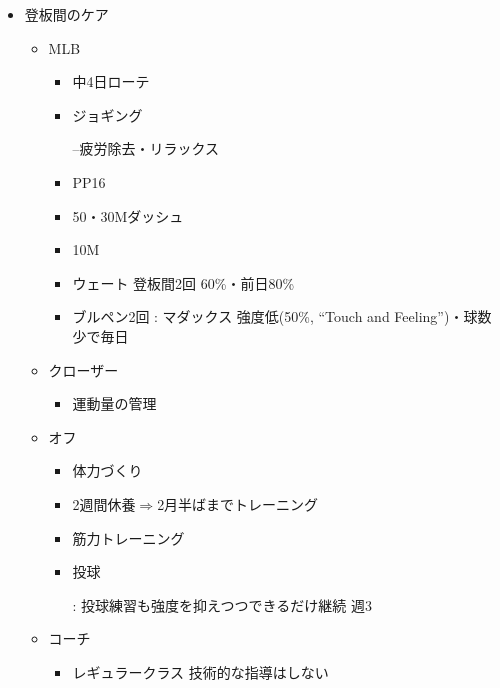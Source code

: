 \documentclass[dvipdfmx, 10.5pt]{jsarticle}
\begin{document}
\begin{itemize}
  \item 登板間のケア

  \begin{itemize}
    \item MLB

    \begin{itemize}
      \item 中4日ローテ

      \item ジョギング

      --疲労除去・リラックス

      \item PP16

      \item 50・30Mダッシュ

      \item 10M

      \item ウェート 登板間2回 60\%・前日80\%

      \item ブルペン2回
      : マダックス 強度低(50\%, ``Touch and Feeling'')・球数少で毎日
    \end{itemize}

    \item クローザー

    \begin{itemize}
      \item 運動量の管理
    \end{itemize}

    \item オフ
    \begin{itemize}
      \item 体力づくり

      \item 2週間休養$\Rightarrow$2月半ばまでトレーニング

      \item 筋力トレーニング

      \item 投球

      : 投球練習も強度を抑えつつできるだけ継続 週3
    \end{itemize}

    \item コーチ

    \begin{itemize}
      \item レギュラークラス 技術的な指導はしない


\end{itemize}
\end{itemize}
\end{itemize}
\end{document}
